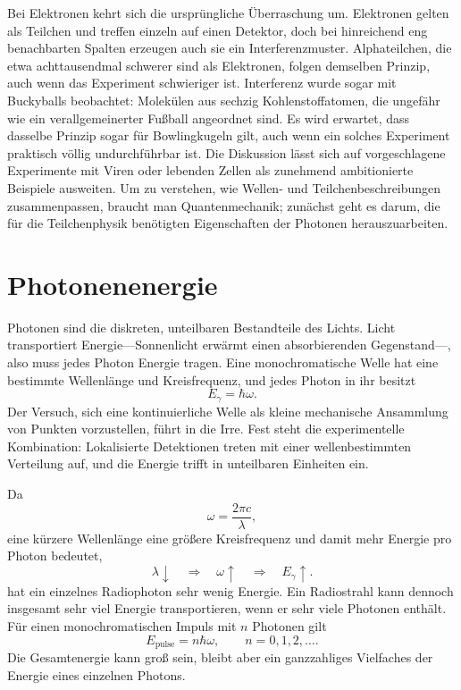 Bei Elektronen kehrt sich die ursprüngliche Überraschung um. Elektronen gelten als Teilchen und treffen einzeln auf einen Detektor, doch bei hinreichend eng benachbarten Spalten erzeugen auch sie ein Interferenzmuster. Alphateilchen, die etwa achttausendmal schwerer sind als Elektronen, folgen demselben Prinzip, auch wenn das Experiment schwieriger ist. Interferenz wurde sogar mit Buckyballs beobachtet: Molekülen aus sechzig Kohlenstoffatomen, die ungefähr wie ein verallgemeinerter Fußball angeordnet sind. Es wird erwartet, dass dasselbe Prinzip sogar für Bowlingkugeln gilt, auch wenn ein solches Experiment praktisch völlig undurchführbar ist. Die Diskussion lässt sich auf vorgeschlagene Experimente mit Viren oder lebenden Zellen als zunehmend ambitionierte Beispiele ausweiten. Um zu verstehen, wie Wellen- und Teilchenbeschreibungen zusammenpassen, braucht man Quantenmechanik; zunächst geht es darum, die für die Teilchenphysik benötigten Eigenschaften der Photonen herauszuarbeiten.

\section{Photonenenergie}

Photonen sind die diskreten, unteilbaren Bestandteile des Lichts. Licht transportiert Energie---Sonnenlicht erwärmt einen absorbierenden Gegenstand---, also muss jedes Photon Energie tragen. Eine monochromatische Welle hat eine bestimmte Wellenlänge und Kreisfrequenz, und jedes Photon in ihr besitzt
\begin{equation}
E_\gamma=\hbar\omega.
\end{equation}
Der Versuch, sich eine kontinuierliche Welle als kleine mechanische Ansammlung von Punkten vorzustellen, führt in die Irre. Fest steht die experimentelle Kombination: Lokalisierte Detektionen treten mit einer wellenbestimmten Verteilung auf, und die Energie trifft in unteilbaren Einheiten ein.

Da
\begin{equation}
\omega=\frac{2\pi c}{\lambda},
\end{equation}
eine kürzere Wellenlänge eine größere Kreisfrequenz und damit mehr Energie pro Photon bedeutet,
\begin{equation}
\lambda\downarrow
\quad\Longrightarrow\quad
\omega\uparrow
\quad\Longrightarrow\quad
E_\gamma\uparrow.
\end{equation}
hat ein einzelnes Radiophoton sehr wenig Energie. Ein Radiostrahl kann dennoch insgesamt sehr viel Energie transportieren, wenn er sehr viele Photonen enthält. Für einen monochromatischen Impuls mit \(n\) Photonen gilt
\begin{equation}
E_{\text{pulse}}=n\hbar\omega,
\qquad
n=0,1,2,\ldots.
\end{equation}
Die Gesamtenergie kann groß sein, bleibt aber ein ganzzahliges Vielfaches der Energie eines einzelnen Photons.

